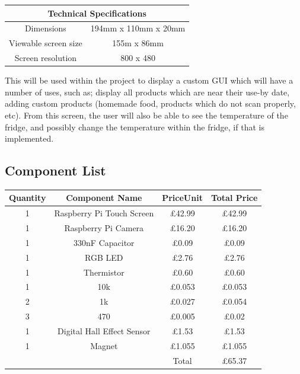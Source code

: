 \documentclass[10pt]{article}
\begin{document}
\begin{center}
	\begin{tabular}{ | c | c | }
		\hline
	 	\multicolumn{2}{|c|}{Technical Specifications} \\ \hline
		Dimensions 		& 194mm x 110mm x 20mm \\ \hline
		Viewable screen size 	& 155m x 86mm \\ \hline
		Screen resolution	& 800 x 480 \\ \hline
	\end{tabular}
\end{center}

This will be used within the project to display a custom GUI which will have a number of uses, such as; display all products which are near their use-by date, adding custom products (homemade food, products which do not scan properly, etc). From this screen, the user will also be able to see the temperature of the fridge, and possibly change the temperature within the fridge, if that is implemented.

\subsection{Component List}
\begin{center}
	\begin{tabular}{ | c | c | c | c |}
		\hline
	 	Quantity & Component Name & PriceUnit & Total Price \\ \hline
		1	& Raspberry Pi Touch Screen 	& \pounds 42.99	& \pounds 42.99 \\ \hline
		1 	& Raspberry Pi Camera 	& \pounds 16.20	& \pounds 16.20 \\ \hline
		1	& 330nF Capacitor	& \pounds 0.09	& \pounds 0.09 \\ \hline
		1	& RGB LED   & \pounds 2.76	& \pounds 2.76 \\ \hline
		1	& Thermistor	& \pounds 0.60	& \pounds 0.60 \\ \hline
		1	& 10k\ohm & \pounds 0.053 	& \pounds 0.053 \\ \hline
		2	& 1k\ohm & \pounds 0.027	& \pounds 0.054 \\ \hline
		3	& 470\ohm & \pounds 0.005	& \pounds 0.02 \\ \hline
		1	& Digital Hall Effect Sensor & \pounds 1.53	& \pounds 1.53 \\ \hline
		1	& Magnet & \pounds 1.055	& \pounds 1.055 \\ \hline
			& 	& Total 	& \pounds 65.37 \\ \hline
	\end{tabular}
\end{center}
\end{document}
